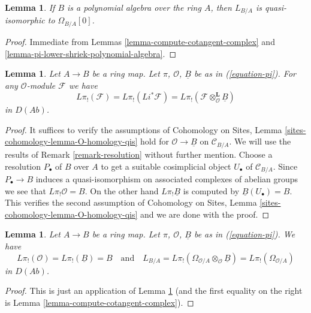 \documentclass[10pt,a4paper]{amsart}
\theoremstyle{plain}
\newtheorem{lemma}[subsection]{Lemma}
\theoremstyle{definition}
\theoremstyle{remark}
\numberwithin{equation}{subsection}
\begin{document}
\begin{lemma}
\label{lemma-cotangent-complex-polynomial-algebra}
If $B$ is a polynomial algebra over the ring $A$, then
$L_{B/A}$ is quasi-isomorphic to $\Omega_{B/A}[0]$.
\end{lemma}

\begin{proof}
Immediate from
Lemmas \ref{lemma-compute-cotangent-complex} and
\ref{lemma-pi-lower-shriek-polynomial-algebra}.
\end{proof}






\begin{lemma}
\label{lemma-O-homology-B-homology}
Let $A \to B$ be a ring map. Let $\pi$, $\mathcal{O}$, $\underline{B}$
be as in (\ref{equation-pi}). For any $\mathcal{O}$-module $\mathcal{F}$
we have
$$
L\pi_!(\mathcal{F}) = L\pi_!(Li^*\mathcal{F}) =
L\pi_!(\mathcal{F} \otimes_\mathcal{O}^\mathbf{L} \underline{B})
$$
in $D(\textit{Ab})$.
\end{lemma}

\begin{proof}
It suffices to verify the assumptions of Cohomology on Sites, Lemma
\ref{sites-cohomology-lemma-O-homology-qis}
hold for $\mathcal{O} \to \underline{B}$ on $\mathcal{C}_{B/A}$.
We will use the results of Remark \ref{remark-resolution} without
further mention. Choose a resolution $P_\bullet$ of $B$ over $A$ to get a
suitable cosimplicial object $U_\bullet$ of $\mathcal{C}_{B/A}$.
Since $P_\bullet \to B$ induces a quasi-isomorphism on associated
complexes of abelian groups we see that $L\pi_!\mathcal{O} = B$.
On the other hand $L\pi_!\underline{B}$ is computed by
$\underline{B}(U_\bullet) = B$. This verifies the second assumption of
Cohomology on Sites, Lemma
\ref{sites-cohomology-lemma-O-homology-qis}
and we are done with the proof.
\end{proof}

\begin{lemma}
\label{lemma-apply-O-B-comparison}
Let $A \to B$ be a ring map. Let $\pi$, $\mathcal{O}$, $\underline{B}$
be as in (\ref{equation-pi}). We have
$$
L\pi_!(\mathcal{O}) = L\pi_!(\underline{B}) = B
\quad\text{and}\quad
L_{B/A} = L\pi_!(\Omega_{\mathcal{O}/A} \otimes_\mathcal{O} \underline{B}) =
L\pi_!(\Omega_{\mathcal{O}/A})
$$
in $D(\textit{Ab})$.
\end{lemma}

\begin{proof}
This is just an application of Lemma \ref{lemma-O-homology-B-homology}
(and the first equality on the right is
Lemma \ref{lemma-compute-cotangent-complex}).
\end{proof}
\end{document}
